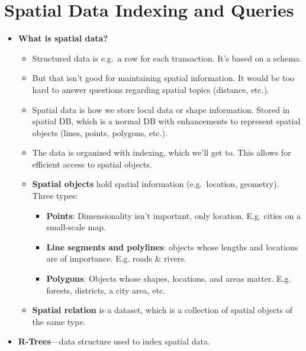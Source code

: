 
\section{Spatial Data Indexing and Queries}
\begin{multicols}{2}
\begin{itemize}
\item
  \textbf{What is spatial data?}

  \begin{itemize}
    \item
    Structured data is e.g.~a row for each transaction. It's based on a
    schema.
  \item
    But that isn't good for maintaining spatial information. It would be
    too hard to answer questions regarding spatial topics (distance,
    etc.).
  \item
    Spatial data is how we store local data or shape information. Stored
    in spatial DB, which is a normal DB with enhancements to represent
    spatial objects (lines, points, polygons, etc.).
  \item
    The data is organized with indexing, which we'll get to. This allows
    for efficient access to spatial objects.
  \item
    \textbf{Spatial objects} hold spatial information (e.g.~location,
    geometry). Three types:

    \begin{itemize}
        \item
      \textbf{Points}: Dimensionality isn't important, only location.
      E.g. cities on a small-scale map.
    \item
      \textbf{Line segments and polylines}: objects whose lengths and
      locations are of importance. E.g. roads \& rivers.
    \item
      \textbf{Polygons}: Objects whose shapes, locations, and areas
      matter. E.g. forests, districts, a city area, etc.
    \end{itemize}
  \item
    \textbf{Spatial relation} is a dataset, which is a collection of
    spatial objects of the same type.
  \end{itemize}
\item
  \textbf{R-Trees}---data structure used to index spatial data.


\end{itemize}
\end{multicols}
